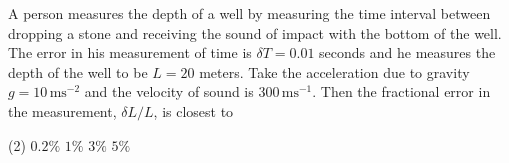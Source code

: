 
    \item A person measures the depth of a well by measuring the time interval between dropping a stone and receiving the sound of impact with the bottom of the well. The error in his measurement of time is \(\delta T = 0.01\) seconds and he measures the depth of the well to be \(L = 20\) meters. Take the acceleration due to gravity \(g = 10 \, \text{ms}^{-2}\) and the velocity of sound is \(300 \, \text{ms}^{-1}\). Then the fractional error in the measurement, \(\delta L / L\), is closest to
        \begin{tasks}(2)
            \task \(0.2\%\)
            \task \(1\%\)
            \task \(3\%\)
            \task \(5\%\)
        \end{tasks}
